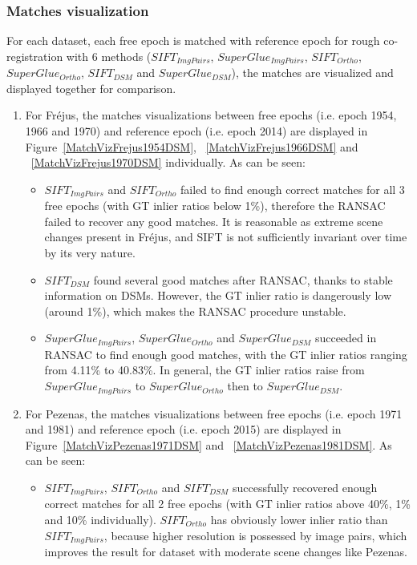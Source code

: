 \subsubsection{Matches visualization}
For each dataset, each free epoch is matched with reference epoch for rough co-registration with 6 methods ($SIFT_{ImgPairs}$, $SuperGlue_{ImgPairs}$, $SIFT_{Ortho}$, $SuperGlue_{Ortho}$, $SIFT_{DSM}$ and $SuperGlue_{DSM}$), the matches are visualized and displayed together for comparison.\\
\begin{enumerate}
	\item For Fr{\'e}jus, the matches visualizations between free epochs (i.e. epoch 1954, 1966 and 1970) and reference epoch (i.e. epoch 2014) are displayed in Figure~\ref{MatchVizFrejus1954DSM}, ~\ref{MatchVizFrejus1966DSM} and ~\ref{MatchVizFrejus1970DSM} individually. As can be seen:\\
	\begin{itemize}
		\item $SIFT_{ImgPairs}$ and $SIFT_{Ortho}$ failed to find enough correct matches for all 3 free epochs (with GT inlier ratios below 1\%), therefore the RANSAC failed to recover any good matches. It is reasonable as extreme scene changes present in Fr{\'e}jus, and SIFT is not sufficiently invariant over time by its very nature.
		\item $SIFT_{DSM}$ found several good matches after RANSAC, thanks to stable information on DSMs. However, the GT inlier ratio is dangerously low (around 1\%), which makes the RANSAC procedure unstable.
		\item $SuperGlue_{ImgPairs}$, $SuperGlue_{Ortho}$ and $SuperGlue_{DSM}$ succeeded in RANSAC to find enough good matches, with the GT inlier ratios ranging from 4.11\% to 40.83\%. In general, the GT inlier ratios raise from $SuperGlue_{ImgPairs}$ to $SuperGlue_{Ortho}$ then to $SuperGlue_{DSM}$.
	\end{itemize}
	\item For Pezenas, the matches visualizations between free epochs (i.e. epoch 1971 and 1981) and reference epoch (i.e. epoch 2015) are displayed in Figure~\ref{MatchVizPezenas1971DSM} and ~\ref{MatchVizPezenas1981DSM}. As can be seen:\\
	\begin{itemize}
		\item $SIFT_{ImgPairs}$, $SIFT_{Ortho}$ and $SIFT_{DSM}$ successfully recovered enough correct matches for all 2 free epochs (with GT inlier ratios above 40\%, 1\% and 10\% individually). $SIFT_{Ortho}$ has obviously lower inlier ratio than $SIFT_{ImgPairs}$, because higher resolution is possessed by image pairs, which improves the result for dataset with moderate scene changes like Pezenas.

\end{itemize}
\end{enumerate}
